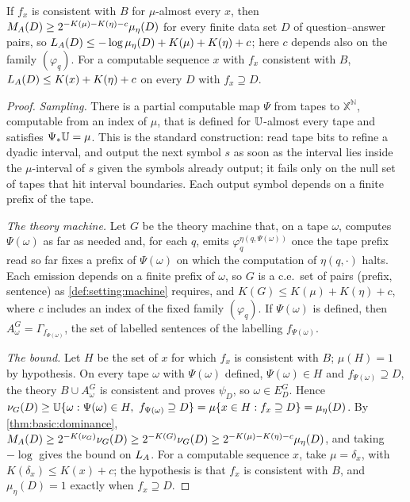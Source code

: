 \begin{proposition}\label{prop:phil:extractor}
If $f_x$ is consistent with $B$ for $\mu$-almost every $x$, then $M_{A}(D)\ge2^{-K(\mu)-K(\eta)-c}\mu_\eta(D)$ for every finite data set $D$ of question--answer pairs, so $L_{A}(D)\le-\log\mu_\eta(D)+K(\mu)+K(\eta)+c$; here $c$ depends also on the family $(\varphi_q)$. For a computable sequence $x$ with $f_x$ consistent with $B$, $L_{A}(D)\le K(x)+K(\eta)+c$ on every $D$ with $f_x\supseteq D$.
\end{proposition}

\begin{proof}
\emph{Sampling.} There is a partial computable map $\Psi$ from tapes to $\mathbb X^{\mathbb N}$, computable from an index of $\mu$, that is defined for $\mathbb{U}$-almost every tape and satisfies $\Psi_*\mathbb{U}=\mu$. This is the standard construction: read tape bits to refine a dyadic interval, and output the next symbol $s$ as soon as the interval lies inside the $\mu$-interval of $s$ given the symbols already output; it fails only on the null set of tapes that hit interval boundaries. Each output symbol depends on a finite prefix of the tape.

\emph{The theory machine.} Let $G$ be the theory machine that, on a tape $\omega$, computes $\Psi(\omega)$ as far as needed and, for each $q$, emits $\varphi_q^{\eta(q,\Psi(\omega))}$ once the tape prefix read so far fixes a prefix of $\Psi(\omega)$ on which the computation of $\eta(q,\cdot)$ halts. Each emission depends on a finite prefix of $\omega$, so $G$ is a c.e.\ set of pairs (prefix, sentence) as \cref{def:setting:machine} requires, and $K(G)\le K(\mu)+K(\eta)+c$, where $c$ includes an index of the fixed family $(\varphi_q)$. If $\Psi(\omega)$ is defined, then $A^G_\omega=\Gamma_{f_{\Psi(\omega)}}$, the set of labelled sentences of the labelling $f_{\Psi(\omega)}$.

\emph{The bound.} Let $H$ be the set of $x$ for which $f_x$ is consistent with $B$; $\mu(H)=1$ by hypothesis. On every tape $\omega$ with $\Psi(\omega)$ defined, $\Psi(\omega)\in H$ and $f_{\Psi(\omega)}\supseteq D$, the theory $B\cup A^G_\omega$ is consistent and proves $\psi_D$, so $\omega\in E^G_D$. Hence $\nu_G(D)\ge\Unif\{\omega:\Psi(\omega)\in H,\ f_{\Psi(\omega)}\supseteq D\}=\mu\{x\in H:f_x\supseteq D\}=\mu_\eta(D)$. By \cref{thm:basic:dominance}, $M_{A}(D)\ge2^{-K(\nu_G)}\nu_G(D)\ge2^{-K(G)}\nu_G(D)\ge2^{-K(\mu)-K(\eta)-c}\mu_\eta(D)$, and taking $-\log$ gives the bound on $L_{A}$. For a computable sequence $x$, take $\mu=\delta_x$, with $K(\delta_x)\le K(x)+c$; the hypothesis is that $f_x$ is consistent with $B$, and $\mu_\eta(D)=1$ exactly when $f_x\supseteq D$.
\end{proof}

